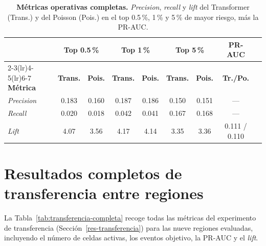 \begin{table}[ht!]
  \centering
  \small
  \begin{tabular}{@{}lcccccccc@{}}
    \toprule
                       & \multicolumn{2}{c}{\textbf{Top 0.5\,\%}} & \multicolumn{2}{c}{\textbf{Top 1\,\%}} & \multicolumn{2}{c}{\textbf{Top 5\,\%}} & \textbf{PR-AUC} &                                                       \\
    \cmidrule(lr){2-3}\cmidrule(lr){4-5}\cmidrule(lr){6-7}
    \textbf{Métrica}   & \textbf{Trans.}                          & \textbf{Pois.}                         & \textbf{Trans.}                        & \textbf{Pois.}  & \textbf{Trans.} & \textbf{Pois.} & \textbf{Tr./Po.} & \\
    \midrule
    \textit{Precision} & 0.183                                    & 0.160                                  & 0.187                                  & 0.186           & 0.150           & 0.151          & ---              & \\
    \textit{Recall}    & 0.020                                    & 0.018                                  & 0.042                                  & 0.041           & 0.167           & 0.168          & ---              & \\
    \textit{Lift}      & 4.07                                     & 3.56                                   & 4.17                                   & 4.14            & 3.35            & 3.36           & 0.111 / 0.110    & \\
    \bottomrule
  \end{tabular}
  \caption[Métricas operativas completas del Transformer y el Poisson]{\textbf{Métricas operativas completas.} \textit{Precision}, \textit{recall} y \textit{lift} del Transformer (Trans.) y del Poisson (Pois.) en el top 0.5\,\%, 1\,\% y 5\,\% de mayor riesgo, más la PR-AUC.}
  \label{tab:operativas-completa}
\end{table}

\section{Resultados completos de transferencia entre regiones}
\label{apendice-transferencia}

La Tabla~\ref{tab:transferencia-completa} recoge todas las métricas del experimento de
transferencia (Sección~\ref{res-transferencia}) para las nueve regiones evaluadas, incluyendo el
número de celdas activas, los eventos objetivo, la PR-AUC y el \textit{lift}.

